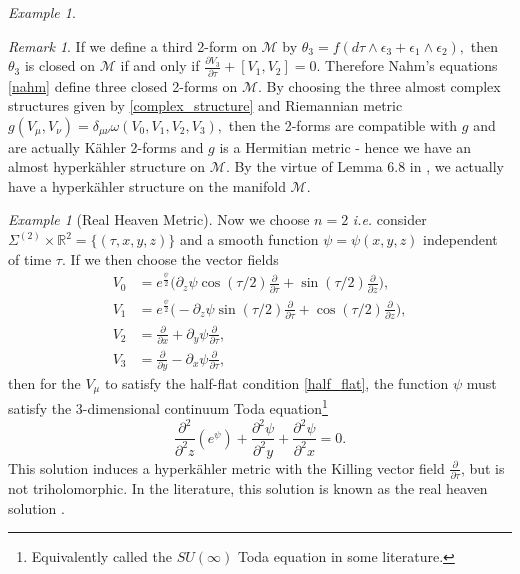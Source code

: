 \documentclass[a4paper,onecolumn,12pt]{article}
\theoremstyle{definition}
\theoremstyle{remark}
\newtheorem{rmk}[thm]{Remark}
\newtheorem{ex}[thm]{Example}
\newcommand{\ie}{\emph{i.e.} }
\newcommand{\e}{\epsilon}
\newcommand{\vm}{V_{\mu}}
\newcommand{\vn}{V_{\nu}}
\newcommand{\ddt}[1]{\frac{\partial #1}{\partial \tau}}
\newcommand{\dd}[2]{\frac{\partial #1}{\partial #2}}
\newcommand{\K}{K\"ahler }
\newcommand{\HK}{hyperk\"ahler }
\newcommand{\R}{\mathbb{R}}
\begin{document}
\begin{ex}
	\begin{rmk}
		If we define a third 2-form on $\mathcal{M}$ by $\theta_{3} = f(d\tau \wedge\e_{3} + \e_{1}\wedge\e_{2}),$ then $\theta_{3}$ is closed on $\mathcal{M}$ if and only if $\dd{V_{3}}{\tau} + [V_{1},V_{2}]=0.$ Therefore Nahm's equations \ref{nahm} define three closed 2-forms on $\mathcal{M}.$ By choosing the three almost complex structures given by \ref{complex_structure} and Riemannian metric $g(\vm,\vn) = \delta_{\mu\nu}\omega(V_{0},V_{1},V_{2},V_{3}),$ then the 2-forms are compatible with $g$ and are actually \K 2-forms and $g$ is a Hermitian metric - hence we have an almost \HK structure on $\mathcal{M}.$ By the virtue of Lemma 6.8 in \cite{hitchin_1987}, we actually have a \HK structure on the manifold $\mathcal{M}.$\\
	\end{rmk}
\end{ex}

\begin{ex}[Real Heaven Metric]
	Now we choose $n=2$ \ie consider $\Sigma^{(2)}\times\R^{2} = \{(\tau,x,y,z)\}$ and a smooth function $\psi = \psi(x,y,z)$ independent of time $\tau$. If we then choose the vector fields
	\begin{subequations}
	\begin{align}
		V_{0} & = e^{\frac{\psi}{2}}\bigg(\partial_{z}\psi\cos(\tau/2)\ddt{} + \sin(\tau/2)\dd{}{z}\bigg),\\
		V_{1} & = e^{\frac{\psi}{2}}\bigg(-\partial_{z}\psi\sin(\tau/2)\ddt{} + \cos(\tau/2)\dd{}{z}\bigg),\\
		V_{2} & = \dd{}{x} + \partial_{y}\psi\ddt{},\\
		V_{3} & = \dd{}{y} - \partial_{x}\psi\ddt{},
	\end{align}
	\end{subequations}
	then for the $\vm$ to satisfy the half-flat condition \ref{half_flat}, the function $\psi$ must satisfy the 3-dimensional continuum Toda equation\footnote{Equivalently called the $SU(\infty)$ Toda equation in some literature.} \cite{ootsuka_1998}
	\begin{equation}
		\frac{\partial^{2}}{\partial^{2}z}(e^{\psi}) + \frac{\partial^{2}\psi}{\partial^{2}y} + \frac{\partial^{2}\psi}{\partial^{2}x} = 0.
	\end{equation}
	This solution induces a \HK metric with the Killing vector field $\ddt{}$, but is not triholomorphic. In the literature, this solution is known as the real heaven solution \cite{plebanski_1975}.
\end{ex}
\end{document}
